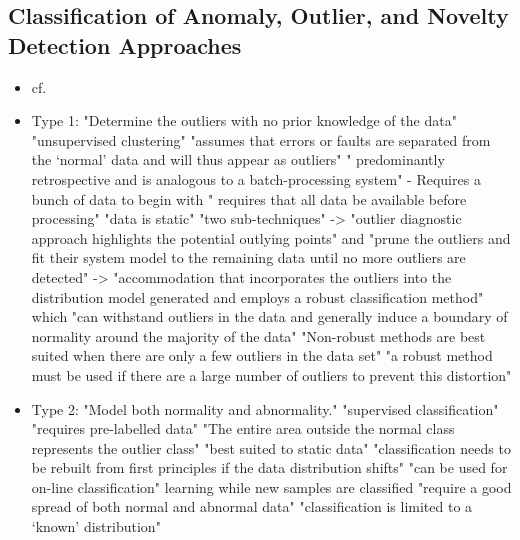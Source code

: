 	\subsection{Classification of Anomaly, Outlier, and Novelty Detection Approaches}
	\begin{itemize}
		\item cf. \textcite{Hodge2004}
		\item Type 1: "Determine the outliers with no prior knowledge of the data" \parencite{Hodge2004}
			\subitem "unsupervised clustering" \parencite{Hodge2004}
			\subitem "assumes that errors or faults are separated from the ‘normal’ data and will thus appear as outliers" \parencite{Hodge2004}
			\subitem " predominantly retrospective and is analogous to a batch-processing system" \parencite{Hodge2004} - Requires a bunch of data to begin with
			\subitem " requires that all data be available before processing" \parencite{Hodge2004}
			\subitem "data is static" \parencite{Hodge2004}
			\subitem "two sub-techniques" \parencite{Hodge2004}
			\subitem -> "outlier diagnostic approach highlights the potential outlying points" \parencite{Hodge2004} and "prune the outliers and fit their system model to the remaining data until no more outliers are detected" \parencite{Hodge2004}
			\subitem -> "accommodation that incorporates the outliers into the distribution model generated and employs a robust classification method" \parencite{Hodge2004} which "can withstand outliers in the data and generally induce a boundary of normality around the majority of the data" \parencite{Hodge2004}
			\subitem "Non-robust methods are best suited when there are only a few outliers in the data set" \parencite{Hodge2004}
			\subitem "a robust method must be used if there are a large number of outliers to prevent this distortion" \parencite{Hodge2004}
		\item Type 2: "Model both normality and abnormality." \parencite{Hodge2004}
			\subitem "supervised classification" \parencite{Hodge2004}
			\subitem "requires pre-labelled data" \parencite{Hodge2004}
			\subitem "The entire area outside the normal class represents the outlier class" \parencite{Hodge2004}
			\subitem "best suited to static data" \parencite{Hodge2004} "classification needs to be rebuilt from first principles if the data distribution shifts" \parencite{Hodge2004}
			\subitem "can be used for on-line classification" \parencite{Hodge2004} learning while new samples are classified
			\subitem "require a good spread of both normal and abnormal data" \parencite{Hodge2004}
			\subitem "classification is limited to a ‘known’ distribution" \parencite{Hodge2004}

\end{itemize}
